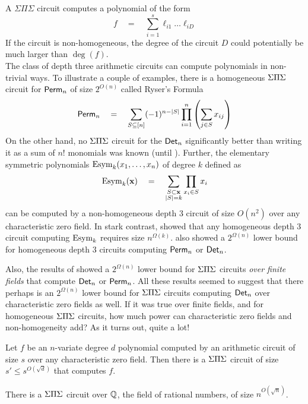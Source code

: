 A $\Sigma\Pi\Sigma$ circuit computes a polynomial of the form
\[
f\quad=\quad \sum_{i=1}^s \ell_{i1}\dots \ell_{iD}
\]
If the circuit is non-homogeneous, the degree of the circuit $D$ could potentially be much larger than $\deg(f)$. \\

The class of depth three arithmetic circuits can compute polynomials in non-trivial ways. To illustrate a couple of examples, there is a homogeneous $\Sigma\Pi\Sigma$ circuit for $\mathsf{Perm}_n$ of size $2^{O(n)}$ called Ryser's Formula \cite{rys63}
\begin{equation}\label{eqn:ryser}
\mathsf{Perm}_n \quad = \quad \sum_{S \subseteq[n]} (-1)^{n - |S|} \prod_{i=1}^n \left(\sum_{j\in S} x_{ij}\right)
\end{equation}
On the other hand, no $\Sigma\Pi\Sigma$ circuit for the $\mathsf{Det}_n$ significantly better than writing it as a sum of $n!$ monomials was known (until \cite{gkks13b}). 
Further, the elementary symmetric polynomials $\mathrm{Esym}_k(x_1,\dots, x_n)$ of degree $k$ defined as
\[
\mathrm{Esym}_k(\mathbf{x}) \quad = \quad \sum_{\substack{S\subset \mathbf{x}\\|S| = k}} \prod_{x_i\in S}x_i
\]
can be computed by a non-homogeneous depth $3$ circuit of size $O(n^2)$ over any characteristic zero field. In stark contrast, \cite{nw1997} showed that any homogeneous depth $3$ circuit computing $\mathrm{Esym}_k$ requires size $n^{\Omega(k)}$. \cite{nw1997} also showed a $2^{\Omega(n)}$ lower bound for homogeneous depth $3$ circuits computing $\mathsf{Perm}_n$ or $\mathsf{Det}_n$. 

Also, the results of \cite{gr00,grigoriev98} showed a $2^{\Omega(n)}$ lower bound for $\Sigma\Pi\Sigma$ circuits \emph{over finite fields} that compute $\mathsf{Det}_n$ or $\mathsf{Perm}_n$. All these results seemed to suggest that there perhaps is an $2^{\Omega(n)}$ 
lower bound for $\Sigma\Pi\Sigma$ circuits computing $\mathsf{Det}_n$ over characteristic zero fields as well. If it was true over finite fields, and for homogeneous $\Sigma\Pi\Sigma$ circuits, how much power can characteristic zero fields and non-homogeneity add? As it turns out, quite a lot!

\begin{theorem} \label{thm:chasm-at-3}
Let $f$ be an $n$-variate degree $d$ polynomial computed by an arithmetic circuit of size $s$ over any characteristic zero field. Then there is a $\Sigma\Pi\Sigma$ circuit of size $s' \leq s^{O(\sqrt{d})}$ that computes $f$. 
\end{theorem}
\begin{corollary}\label{cor:det-sps}
There is a $\Sigma\Pi\Sigma$ circuit over $\mathbb{Q}$, the field of rational numbers, of size $n^{O(\sqrt{n})}$. 
\end{corollary}

